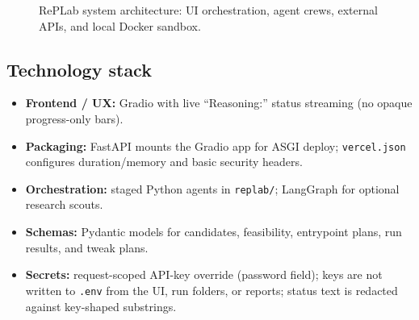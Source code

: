 \documentclass[11pt,a4paper]{article}
\begin{document}
\begin{figure}[t]
\centering
{}
\caption{RePLab system architecture: UI orchestration, agent crews, external APIs, and local Docker sandbox.}
\label{fig:arch}
\end{figure}

\subsection{Technology stack}
\begin{itemize}[leftmargin=*,itemsep=2pt]
  \item \textbf{Frontend / UX:} Gradio with live ``Reasoning:'' status streaming
        (no opaque progress-only bars).
  \item \textbf{Packaging:} FastAPI mounts the Gradio app for ASGI deploy;
        \texttt{vercel.json} configures duration/memory and basic security
        headers.
  \item \textbf{Orchestration:} staged Python agents in \texttt{replab/};
        LangGraph for optional research scouts.
  \item \textbf{Schemas:} Pydantic models for candidates, feasibility,
        entrypoint plans, run results, and tweak plans.
  \item \textbf{Secrets:} request-scoped API-key override (password field);
        keys are not written to \texttt{.env} from the UI, run folders, or
        reports; status text is redacted against key-shaped substrings.
\end{itemize}
\end{document}
